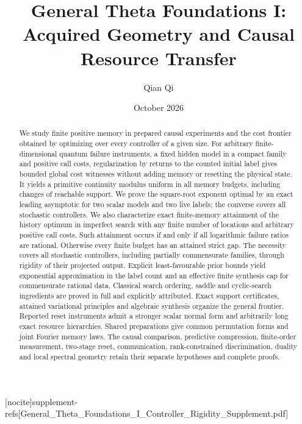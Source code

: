 
[nocite]{supplement-refs}[General_Theta_Foundations_I_Controller_Rigidity_Supplement.pdf]
\title[Acquired geometry and causal resource transfer]{General Theta Foundations I:\\Acquired Geometry and Causal Resource Transfer}
\author{Qian Qi}\date{October 2026}

\begin{abstract}
We study finite positive memory in prepared causal experiments and the
cost frontier obtained by optimizing over every controller of a given
size.  For arbitrary finite-dimensional quantum failure instruments,
a fixed hidden model in a compact family and positive call costs,
regularization by returns to the counted initial label gives bounded
global cost witnesses without adding memory or resetting the physical
state.  It yields a primitive continuity modulus uniform in all memory
budgets, including changes of reachable support.  We prove the
square-root exponent optimal by an exact leading asymptotic for two
scalar models and two live labels; the converse covers all stochastic
controllers.  We also characterize exact finite-memory attainment of
the history optimum in imperfect search with any finite number of
locations and arbitrary positive call costs.  Such attainment occurs
if and only if all logarithmic failure ratios are rational.  Otherwise
every finite budget has an attained strict gap.  The necessity covers
all stochastic controllers, including partially commensurate families,
through rigidity of their projected output.  Explicit least-favourable
prior bounds yield exponential approximation in the label count and
an effective finite synthesis cap for commensurate rational data.
Classical search ordering, saddle and cyclic-search ingredients are
proved in full and explicitly attributed.
Exact support certificates, attained variational principles and
algebraic synthesis organize the general frontier.  Reported reset
instruments admit a stronger scalar normal form and arbitrarily long
exact resource hierarchies.  Shared preparations give common
permutation forms and joint Fourier memory laws.  The causal comparison,
predictive compression, finite-order measurement, two-stage reset,
communication, rank-constrained discrimination, duality and local
spectral geometry retain their separate hypotheses and complete proofs.
\end{abstract}
